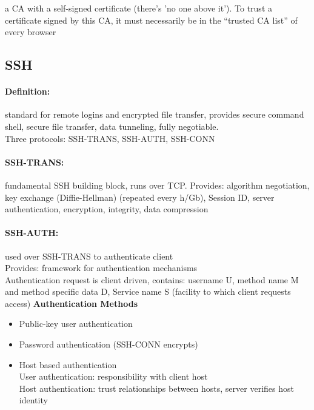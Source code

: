 
 a CA with a self-signed certificate (there's 'no one above it'). To trust a certificate signed by this CA, it must necessarily be in the ``trusted CA list'' of every browser

\subsection{SSH}

\paragraph{Definition:} standard for remote logins and encrypted file transfer, provides secure command shell, secure file transfer, data tunneling, fully negotiable. 
\\Three protocols: SSH-TRANS, SSH-AUTH, SSH-CONN

\paragraph{SSH-TRANS:} fundamental SSH building block, runs over TCP. Provides: algorithm negotiation, key exchange (Diffie-Hellman) (repeated every h/Gb), Session ID, server authentication, encryption, integrity, data compression

\paragraph{SSH-AUTH:} used over SSH-TRANS to authenticate client \\
Provides: framework for authentication mechanisms\\
Authentication request is client driven, contains: username U, method name M and method specific data D, Service name S (facility to which client requests access)
\textbf{Authentication Methods}
\begin{itemize}
\item Public-key user authentication
\item Password authentication (SSH-CONN encrypts) 
\item Host based authentication\\
\quad User authentication: responsibility with client host\\
\quad Host authentication: trust relationships between hosts, server verifies host identity
\end{itemize}

